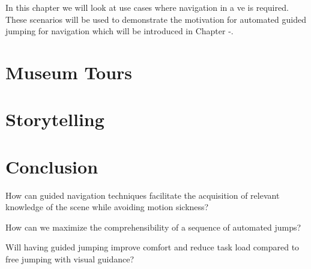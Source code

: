 \label{Chapter:Guided Jumping Motivation}
In this chapter we will look at use cases where navigation in a \acrshort{ve} is required. These scenarios will be used to demonstrate the motivation for automated guided jumping for navigation which will be introduced in Chapter -. 

\section{Museum Tours}
\label{section:GJS Museum Tours}

\section{Storytelling}
\label{section:GJS Storytelling}

\section{Conclusion}
\label{section:GJS Conclusion}

\begin{researchq}
	\label{rq:rq1}
	How can guided navigation techniques facilitate the acquisition of relevant knowledge of the scene while avoiding motion sickness?
\end{researchq}
\begin{researchq}
	\label{rq:rq2}
	How can we maximize the comprehensibility of a sequence of automated jumps?
\end{researchq}
\begin{researchq}
	\label{rq:rq3}
	Will having guided jumping improve comfort and reduce task load compared to free jumping with visual guidance?
\end{researchq}
